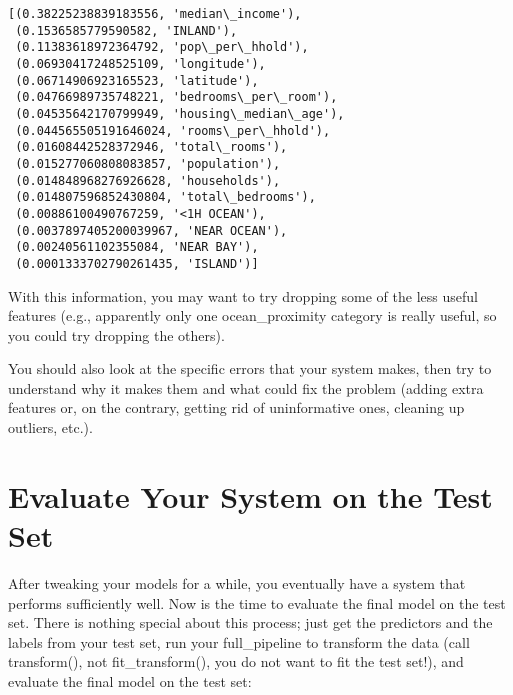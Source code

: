 \documentclass[11pt]{article}
\makeatletter
\newcommand{\boxspacing}{\kern\kvtcb@left@rule\kern\kvtcb@boxsep}
\newcommand{\prompt}[4]{
        \ttfamily\llap{{\color{#2}[#3]:\hspace{3pt}#4}}\vspace{-\baselineskip}
    }
\makeatother
\begin{document}
            \begin{tcolorbox}[breakable, size=fbox, boxrule=.5pt, pad at break*=1mm, opacityfill=0]
\prompt{Out}{outcolor}{43}{\boxspacing}
\begin{Verbatim}[commandchars=\\\{\}]
[(0.38225238839183556, 'median\_income'),
 (0.1536585779590582, 'INLAND'),
 (0.11383618972364792, 'pop\_per\_hhold'),
 (0.06930417248525109, 'longitude'),
 (0.06714906923165523, 'latitude'),
 (0.04766989735748221, 'bedrooms\_per\_room'),
 (0.04535642170799949, 'housing\_median\_age'),
 (0.044565505191646024, 'rooms\_per\_hhold'),
 (0.01608442528372946, 'total\_rooms'),
 (0.015277060808083857, 'population'),
 (0.014848968276926628, 'households'),
 (0.014807596852430804, 'total\_bedrooms'),
 (0.00886100490767259, '<1H OCEAN'),
 (0.0037897405200039967, 'NEAR OCEAN'),
 (0.00240561102355084, 'NEAR BAY'),
 (0.0001333702790261435, 'ISLAND')]
\end{Verbatim}
\end{tcolorbox}
        
    With this information, you may want to try dropping some of the less
useful features (e.g., apparently only one ocean\_proximity category is
really useful, so you could try dropping the others).

You should also look at the specific errors that your system makes, then
try to understand why it makes them and what could fix the problem
(adding extra features or, on the contrary, getting rid of uninformative
ones, cleaning up outliers, etc.).

    \hypertarget{evaluate-your-system-on-the-test-set}{%
\section{Evaluate Your System on the Test
Set}\label{evaluate-your-system-on-the-test-set}}

    After tweaking your models for a while, you eventually have a system
that performs sufficiently well. Now is the time to evaluate the final
model on the test set. There is nothing special about this process; just
get the predictors and the labels from your test set, run your
full\_pipeline to transform the data (call transform(), not
fit\_transform(), you do not want to fit the test set!), and evaluate
the final model on the test set:
\end{document}
